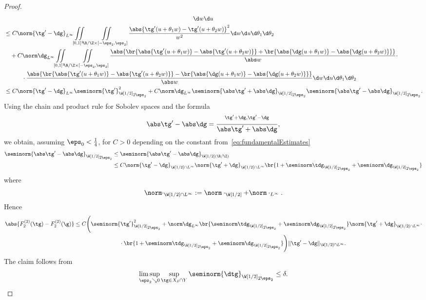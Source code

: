 \begin{proof}
\begin{align*}
  & \hspace{11.2cm} \d w\d u \\
  &\le C\norm{\dgt-\dg}_{L^\infty}\iint\limits_{[0,1]^2}\iint\limits_{\R/\Z\times[-\eps_2,\eps_2]}\frac{\abs{\dgt(u+\theta_1w)-\dgt(u+\theta_2w)}^2}{w^2}\d w\d u\d\theta_1\d\theta_2 \\
  &\quad{}+C\norm\dg_{L^{\infty}}\iint\limits_{[0,1]^2}\iint\limits_{\R/\Z\times[-\eps_2,\eps_2]}\frac{\abs{\br{\abs{\dgt(u+\theta_1w)}-\abs{\dgt(u+\theta_2w)}}+\br{\abs{\dg(u+\theta_1w)}-\abs{\dg(u+\theta_2w)}}}}{\abs w}\cdot \\
  &\qquad\quad{}\cdot\frac{\abs{\br{\abs{\dgt(u+\theta_1w)}-\abs{\dgt(u+\theta_2w)}}-\br{\abs{\dg(u+\theta_1w)}-\abs{\dg(u+\theta_2w)}}}}{\abs w}\d w\d u\d\theta_1\d\theta_2 \\
  &\le C\norm{\dgt-\dg}_{L^\infty}\seminorm{\dgt}_{\W[1/2]_{\scriptstyle 2\eps_2}}^2
      + C\norm\dg_{L^{\infty}}\seminorm{\abs\dgt+\abs\dg}_{\W[1/2]_{\scriptstyle 2\eps_2}}\seminorm{\abs\dgt-\abs\dg}_{\W[1/2]_{\scriptstyle 2\eps_2}}.
 \end{align*}
 Using the chain and product rule for Sobolev spaces and the formula
 \[
  \abs\dgt-\abs\dg 
  = \frac{\sp{\dgt+\dg,\dgt-\dg}}{\abs\dgt+\abs\dg},
 \]
 we obtain, assuming $\eps_{0}<\tfrac14$, for $C>0$ depending on
 the constant from~\eqref{eq:fundamentalEstimates}
 \begin{align*}
  \seminorm{\abs\dgt-\abs\dg}_{\W[1/2]_{\scriptstyle 2\eps_2}} 
  &\le \seminorm{\abs\dgt-\abs\dg}_{\W[1/2](\R/\Z)} \\
  &\le C \norm{\dgt-\dg}_{\W[1/2]\cap L^{\infty}}
  \norm{\dgt+\dg}_{\W[1/2]\cap L^{\infty}}\br{1+\seminorm\tdg_{\W[1/2]_{\scriptstyle 2\eps_2}}+\seminorm\dg_{\W[1/2]_{\scriptstyle 2\eps_2}}}
  \end{align*}
 where
 \[ \norm\cdot_{\W[1/2]\cap L^{\infty}} := \norm\cdot_{\W[1/2]}+\norm\cdot_{L^{\infty}}. \]
 Hence
 \begin{align*}
    \abs{F_2^{(2)}(\gt)-F_2^{(2)}(\g)}
    &\le C \Bigg(\seminorm{\dgt}_{\W[1/2]_{\scriptstyle 2\eps_2}}^2 +
    \norm\dg_{L^{\infty}}\br{\seminorm\tdg_{\W[1/2]_{\scriptstyle 2\eps_2}}+\seminorm\dg_{\W[1/2]_{\scriptstyle 2\eps_2}}}
    \norm{\dgt+\dg}_{\W[1/2]\cap L^{\infty}}\cdot \\
    &\qquad\qquad\qquad\qquad{}\cdot\br{1+\seminorm\tdg_{\W[1/2]_{\scriptstyle 2\eps_2}}+\seminorm\dg_{\W[1/2]_{\scriptstyle 2\eps_2}}}
     \Bigg)
    \|\dgt-\dg\|_{\W[1/2]\cap L^{\infty}}.
 \end{align*}
 The claim follows from
 \[ \limsup_{\eps_{2}\searrow0}\sup_{\tg\in X_{\delta}\cap Y}\seminorm{\dtg}_{\W[1/2]_{\scriptstyle2\eps_{2}}} \le \delta. \]
\end{proof}

